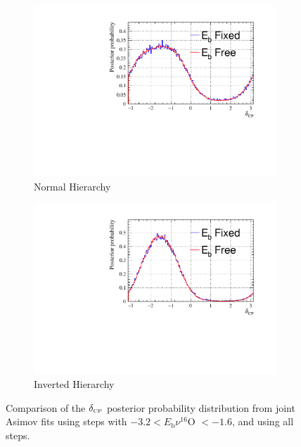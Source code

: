 \begin{figure}[!htbp]
\centering
\begin{subfigure}{.7\textwidth}
  \centering
  \includegraphics[width=0.95\linewidth]{figs/compMaCh3Contours_EB_asimov/compMaCh3Contours_EB_dcp_asimovA_NH}
  \caption{Normal Hierarchy}
  \label{fig:EBdcpNH}
\end{subfigure}
\begin{subfigure}{.7\textwidth}
  \centering
  \includegraphics[width=0.95\linewidth]{figs/compMaCh3Contours_EB_asimov/compMaCh3Contours_EB_dcp_asimovA_IH}
  \caption{Inverted Hierarchy}
  \label{fig:EBdcpIH}
\end{subfigure}
\caption{Comparison of the $\delta_{\scriptscriptstyle\mathrm{CP}}$ posterior probability distribution from joint Asimov fits using steps with $ -3.2 < E_{\mathrm{b}} \nu ^{16}$O $< -1.6$, and using all steps.}
\label{fig:EBdcp}
\end{figure}

